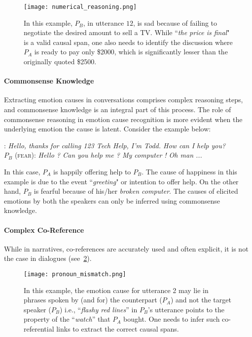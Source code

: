 \documentclass[smallextended]{svjour3}
\newcommand\emo[1]{\textsc{#1}}
\newcommand\0{\hphantom{0}}
\begin{document}
\begin{figure}[t!]
    \centering
    \texttt{[image: numerical\_reasoning.png]}
    \caption{{In this example, $P_B$, in utterance $12$, is sad because of failing to negotiate the desired amount to sell a TV. While ``\textit{the price is final}" is a valid causal span, one also needs to identify the discussion where $P_A$ is ready to pay only \$2000, which is significantly lesser than the originally quoted \$2500.}}
    \label{fig:numerical_reasoning}
\end{figure}

\paragraph{Commonsense Knowledge} Extracting emotion causes in conversations comprises complex reasoning steps, and commonsense knowledge is an integral part of this process. The role of commonsense reasoning in emotion cause recognition is more evident when the underlying emotion the cause is latent. Consider the example below:
\begin{exe}
\ex {$P_A$ (\emo{happy})}: \textit{Hello, thanks for calling 123 Tech Help, I'm Todd. How can I help you?}\\
{$P_B$ (\emo{fear})}: \textit{Hello ? Can you help me ? My computer ! Oh man ...}
\label{ex:latent}
\end{exe}
In this case, $P_A$ is happily offering help to $P_B$. The cause of happiness in this example is due to the event ``\textit{greeting}" or intention to offer help. On the other hand, $P_B$ is fearful because of his/her \textit{broken computer}. The causes of elicited emotions by both the speakers can only be inferred using commonsense knowledge.

\paragraph{Complex Co-Reference} While in narratives, co-references are accurately used and often explicit, it is not the case in dialogues (see~\cref{fig:pronoun_mismatch}).  

\begin{figure}[t!]
    \centering
    \texttt{[image: pronoun\_mismatch.png]}
    \caption{{In this example, the emotion cause for utterance 2 may lie in phrases spoken by (and for) the counterpart ($P_A$) and not the target speaker ($P_B$) i.e., ``\textit{flashy red lines}'' in $P_B$'s utterance points to the property of the ``\textit{watch}'' that $P_A$ bought. One needs to infer such co-referential links to extract the correct causal spans.}}
    \label{fig:pronoun_mismatch}
\end{figure}
\end{document}
